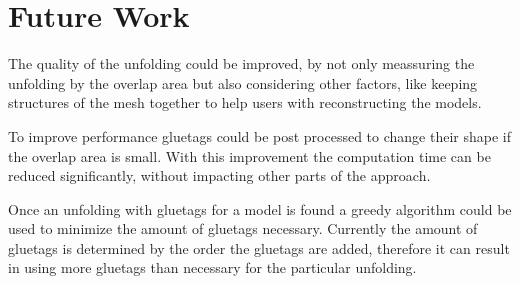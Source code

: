 \documentclass[draft,final]{vutinfth} %
\begin{document}
\section{Future Work}
The quality of the unfolding could be improved, by not only meassuring the unfolding by the overlap area but also considering other factors, like keeping structures of the mesh together to help users with reconstructing the models.

To improve performance gluetags could be post processed to change their shape if the overlap area is small. With this improvement the computation time can be reduced significantly, without impacting other parts of the approach.

Once an unfolding with gluetags for a model is found a greedy algorithm could be used to minimize the amount of gluetags necessary. Currently the amount of gluetags is determined by the order the gluetags are added, therefore it can result in using more gluetags than necessary for the particular unfolding.
\backmatter

\listoffigures %

\cleardoublepage %
\listoftables %

\listofalgorithms
{}

\printindex

\printglossaries



\end{document}
